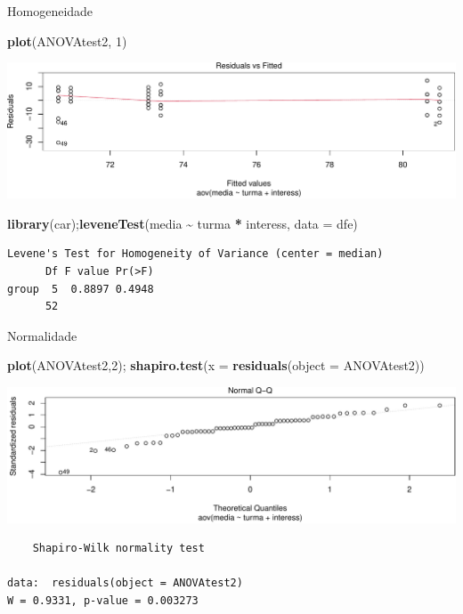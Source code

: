 \documentclass[
  9pt,
  ignorenonframetext,
  aspectratio=169]{beamer}
\newenvironment{Shaded}{\begin{snugshade}}{\end{snugshade}}
\newcommand{\DataTypeTok}[1]{\textcolor[rgb]{0.13,0.29,0.53}{#1}}
\newcommand{\DecValTok}[1]{\textcolor[rgb]{0.00,0.00,0.81}{#1}}
\newcommand{\KeywordTok}[1]{\textcolor[rgb]{0.13,0.29,0.53}{\textbf{#1}}}
\newcommand{\NormalTok}[1]{#1}
\newcommand{\OperatorTok}[1]{\textcolor[rgb]{0.81,0.36,0.00}{\textbf{#1}}}
\newcommand{\StringTok}[1]{\textcolor[rgb]{0.31,0.60,0.02}{#1}}
\begin{document}
\begin{frame}[fragile]{Homogeneidade}
\protect\hypertarget{homogeneidade}{}
\begin{Shaded}
\begin{Highlighting}[]
\KeywordTok{plot}\NormalTok{(ANOVAtest2, }\DecValTok{1}\NormalTok{)}
\end{Highlighting}
\end{Shaded}

\includegraphics{aula_11_files/figure-beamer/unnamed-chunk-22-1.pdf}

\begin{Shaded}
\begin{Highlighting}[]
\KeywordTok{library}\NormalTok{(car);}\KeywordTok{leveneTest}\NormalTok{(media }\OperatorTok{\textasciitilde{}}\StringTok{ }\NormalTok{turma }\OperatorTok{*}\StringTok{ }\NormalTok{interess, }\DataTypeTok{data =}\NormalTok{ dfe)}
\end{Highlighting}
\end{Shaded}

\begin{verbatim}
Levene's Test for Homogeneity of Variance (center = median)
      Df F value Pr(>F)
group  5  0.8897 0.4948
      52               
\end{verbatim}
\end{frame}

\begin{frame}[fragile]{Normalidade}
\protect\hypertarget{normalidade}{}
\begin{Shaded}
\begin{Highlighting}[]
\KeywordTok{plot}\NormalTok{(ANOVAtest2,}\DecValTok{2}\NormalTok{); }\KeywordTok{shapiro.test}\NormalTok{(}\DataTypeTok{x =} \KeywordTok{residuals}\NormalTok{(}\DataTypeTok{object =}\NormalTok{ ANOVAtest2))}
\end{Highlighting}
\end{Shaded}

\includegraphics{aula_11_files/figure-beamer/unnamed-chunk-23-1.pdf}

\begin{verbatim}
    Shapiro-Wilk normality test

data:  residuals(object = ANOVAtest2)
W = 0.9331, p-value = 0.003273
\end{verbatim}
\end{frame}
\end{document}
